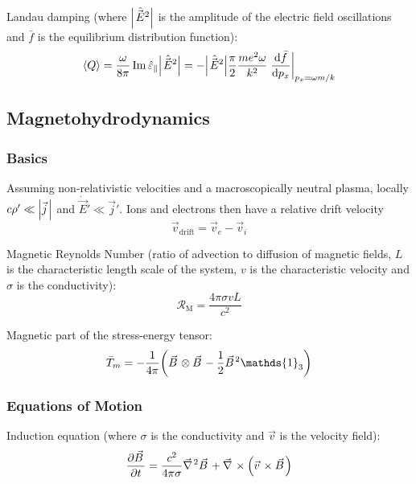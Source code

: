 			\noindent
			Landau damping (where $\abs{\hat{\vec{E}}^2}$ is the amplitude of the electric field oscillations and $\bar{f}$ is the equilibrium distribution function):
			\begin{equation}
				\avg{Q}
				= \frac{\omega}{8 \pi} \Im \hat{\varepsilon}_\parallel \abs{\hat{\vec{E}}^2}
				= - \abs{\hat{\vec{E}}^2} \frac{\pi}{2} \frac{m e^2 \omega}{k^2} \eval{\dv{\bar{f}}{p_x}}_{p_x = \omega m /k}
			\end{equation}

	\subsection{Magnetohydrodynamics}
		\subsubsection{Basics}
			Assuming non-relativistic velocities and a macroscopically neutral plasma, \ie locally $c\rho' \ll \abs{\vec{j}}$ and $\dot{\vec{E}}' \ll \vec{j}'$.
			Ions and electrons then have a relative drift velocity
			\begin{equation}
				\vec{v}_{\text{drift}} = \vec{v}_e - \vec{v}_i
			\end{equation}

			\noindent
			Magnetic Reynolds Number (ratio of advection to diffusion of magnetic fields, $L$ is the characteristic length scale of the system, $v$ is the characteristic velocity and $\sigma$ is the conductivity):
			\begin{equation}
				\mathcal{R}_\text{M} = \frac{4\pi\sigma v L}{c^2}
			\end{equation}

			\noindent
			Magnetic part of the stress-energy tensor:
			\begin{equation}
				\bar{T}_m = -\frac{1}{4\pi} \qty(\vec{B} \otimes \vec{B} - \frac{1}{2}\vec{B}^2 \mathds{1}_3)
			\end{equation}

		\subsubsection{Equations of Motion}
			Induction equation (where $\sigma$ is the conductivity and $\vec{v}$ is the velocity field):
			\begin{equation}
				\pdv{\vec{B}}{t} = \frac{c^2}{4\pi\sigma} \Nabla^2 \vec{B} + \Nabla\times\qty(\vec{v}\times\vec{B})
			\end{equation}

